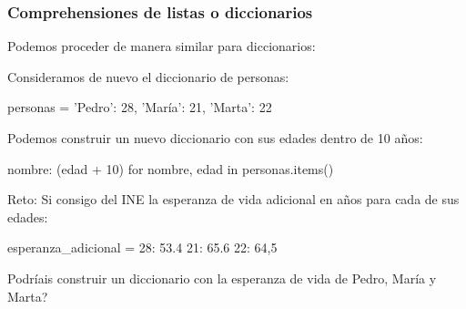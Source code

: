 \documentclass[handout,9pt]{beamer}
\begin{document}
  \begin{frame}[fragile]
  \frametitle{Comprehensiones de listas o diccionarios}
Podemos proceder de manera similar para diccionarios:

Consideramos de nuevo el diccionario de personas:
\begin{pyconsole}
personas = {
   'Pedro': 28,
   'María': 21,
   'Marta': 22
}
\end{pyconsole}
Podemos construir un nuevo diccionario con sus edades dentro de 10 años:
\begin{pyconsole}
{nombre: (edad + 10) for nombre, edad in personas.items()}
\end{pyconsole}
\begin{block}{Reto:}
 Si consigo del INE la esperanza de vida adicional en años para cada
 de sus edades:
 \begin{pyverbatim}
esperanza_adicional = {
     28: 53.4
     21: 65.6
     22: 64,5
}
 \end{pyverbatim}
Podríais construir un diccionario con la esperanza de vida de  Pedro, María y
Marta?
\end{block}
\end{frame}
  
  
\end{document}
